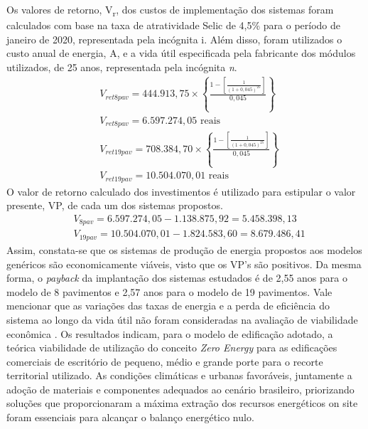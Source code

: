 \noindent Os valores de retorno, V\textsubscript{r}, dos custos de implementação dos sistemas foram calculados com base na taxa de atratividade Selic de 4,5\% para o período de janeiro de 2020, representada pela incógnita i. Além disso, foram utilizados o custo anual de energia, A, e a vida útil especificada pela fabricante dos módulos utilizados, de 25 anos, representada pela incógnita \textit{n}.
\begin{align}
    &V_{ret8pav}=444.913,75 \times \left\{\frac{1-\left[\frac{1}{(1+0,045)^25}\right]}{0,045}\right\} \nonumber \\
    &V_{ret8pav}=6.597.274,05 \text{ reais} \nonumber \\
    &V_{ret19pav}=708.384,70 \times \left\{\frac{1-\left[\frac{1}{(1+0,045)^25}\right]}{0,045}\right\} \nonumber \\
    &V_{ret19pav}=10.504.070,01 \text{ reais} \nonumber
\end{align}
\noindent O valor de retorno calculado dos investimentos é utilizado para estipular o valor presente, VP, de cada um dos sistemas propostos.
\begin{align}
    &V_{8pav}=6.597.274,05 - 1.138.875,92 = 5.458.398,13 \nonumber \\
    &V_{19pav}=10.504.070,01 - 1.824.583,60 = 8.679.486,41 \nonumber
\end{align}
\noindent Assim, constata-se que os sistemas de produção de energia propostos aos modelos genéricos são economicamente viáveis, visto que os VP’s são positivos. Da mesma forma, o \textit{payback} da implantação dos sistemas estudados é de 2,55 anos para o modelo de 8 pavimentos e 2,57 anos para o modelo de 19 pavimentos. Vale mencionar que as variações das taxas de energia e a perda de eficiência do sistema ao longo da vida útil não foram consideradas na avaliação de viabilidade econômica \cite{Sorgato2018}.\vspace*{0.3cm} \newline
\noindent Os resultados indicam, para o modelo de edificação adotado, a teórica viabilidade de utilização do conceito \textit{Zero Energy} para as edificações comerciais de escritório de pequeno, médio e grande porte para o recorte territorial utilizado. As condições climáticas e urbanas favoráveis, juntamente a adoção de materiais e componentes adequados ao cenário brasileiro, priorizando soluções que proporcionaram a máxima extração dos recursos energéticos on site foram essenciais para alcançar o balanço energético nulo.